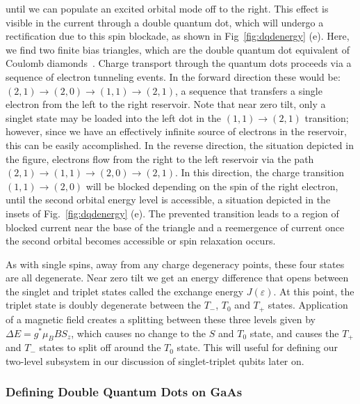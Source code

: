 until we can populate an excited orbital mode off to the right. This effect is visible in the current through a double
quantum dot, which will undergo a rectification due to this spin blockade, as shown in Fig~\ref{fig:dqdenergy} (e).
Here, we find two finite bias triangles, which are the double quantum dot equivalent of Coulomb diamonds~\cite{PhysRevB.72.165308}.
Charge transport through the quantum dots proceeds via a sequence of electron tunneling events. In the forward direction
these would be: $(2, 1) \rightarrow (2, 0) \rightarrow (1, 1) \rightarrow (2, 1)$, a sequence that transfers a single electron
from the left to the right reservoir. Note that near zero tilt, only a singlet state may be loaded into the left dot
in the $(1, 1) \rightarrow (2, 1)$ transition; however, since we have an effectively infinite source of electrons in the
reservoir, this can be easily accomplished. In the reverse direction, the situation depicted in the figure, electrons flow
from the right to the left reservoir via the path $(2, 1) \rightarrow (1, 1) \rightarrow (2, 0) \rightarrow (2, 1)$.
In this direction, the charge transition $(1, 1) \rightarrow (2, 0)$ will be blocked depending on the spin of the right
electron, until the second orbital energy level is accessible, a situation depicted in the insets of Fig.~\ref{fig:dqdenergy} (e).
The prevented transition leads to a region of blocked current near the base of the triangle and a reemergence of current once the second orbital
becomes accessible or spin relaxation occurs.

As with single spins, away from any charge degeneracy points, these four states are all degenerate. Near zero tilt we get an
energy difference that opens between the singlet and triplet states called the exchange energy $J(\varepsilon)$. At this
point, the triplet state is doubly degenerate between the $T_-$, $T_0$ and $T_+$ states. Application of a magnetic field creates
a splitting between these three levels given by $\Delta E = g^* \mu_B B S_z$, which causes no change to the $S$ and $T_0$ state,
and causes the $T_+$ and $T_-$ states to split off around the $T_0$ state. This will useful for defining our two-level subsystem
in our discussion of singlet-triplet qubits later on.

\subsubsection{Defining Double Quantum Dots on GaAs}

